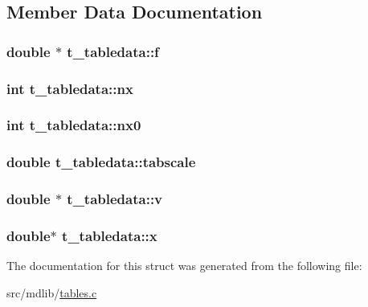 \subsection{\-Member \-Data \-Documentation}
\hypertarget{structt__tabledata_afccea3bd04225c5759193b339ff28b93}{
\subsubsection[{f}]{\setlength{\rightskip}{0pt plus 5cm}double $\ast$ {\bf t\-\_\-tabledata\-::f}}}\label{structt__tabledata_afccea3bd04225c5759193b339ff28b93}
\hypertarget{structt__tabledata_a54edeae7108f8abe0606b3a75801b397}{
\subsubsection[{nx}]{\setlength{\rightskip}{0pt plus 5cm}int {\bf t\-\_\-tabledata\-::nx}}}\label{structt__tabledata_a54edeae7108f8abe0606b3a75801b397}
\hypertarget{structt__tabledata_a9b7902088bba50a45c29c6884a922ce9}{
\subsubsection[{nx0}]{\setlength{\rightskip}{0pt plus 5cm}int {\bf t\-\_\-tabledata\-::nx0}}}\label{structt__tabledata_a9b7902088bba50a45c29c6884a922ce9}
\hypertarget{structt__tabledata_a56a70c28227d3d613d1afc1d578d4587}{
\subsubsection[{tabscale}]{\setlength{\rightskip}{0pt plus 5cm}double {\bf t\-\_\-tabledata\-::tabscale}}}\label{structt__tabledata_a56a70c28227d3d613d1afc1d578d4587}
\hypertarget{structt__tabledata_ad683356b56bfda6156542f4ad41fa234}{
\subsubsection[{v}]{\setlength{\rightskip}{0pt plus 5cm}double $\ast$ {\bf t\-\_\-tabledata\-::v}}}\label{structt__tabledata_ad683356b56bfda6156542f4ad41fa234}
\hypertarget{structt__tabledata_a32159029ce69a016b4f44d13804e3992}{
\subsubsection[{x}]{\setlength{\rightskip}{0pt plus 5cm}double$\ast$ {\bf t\-\_\-tabledata\-::x}}}\label{structt__tabledata_a32159029ce69a016b4f44d13804e3992}


\-The documentation for this struct was generated from the following file\-:\begin{DoxyCompactItemize}
\item 
src/mdlib/\hyperlink{tables_8c}{tables.\-c}\end{DoxyCompactItemize}
